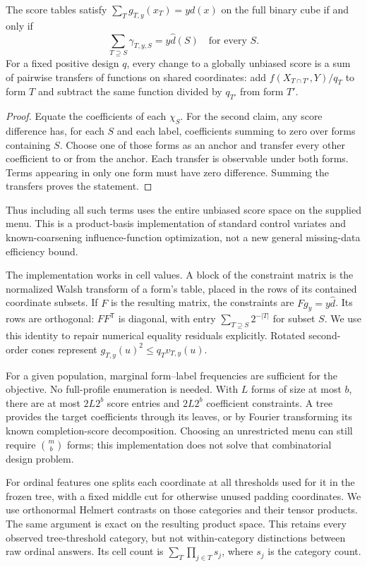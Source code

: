 \begin{proposition}\label{prop:sharing}
The score tables satisfy $\sum_Tg_{T,y}(x_T)=yd(x)$ on the full binary cube
if and only if
\[
       \sum_{T\supseteq S}\gamma_{T,y,S}=y\widehat d(S)
       \quad\text{for every }S.
\]
For a fixed positive design $q$, every change to a globally unbiased score
is a sum of pairwise transfers of functions on shared coordinates:
add $f(X_{T\cap T'},Y)/q_T$ to form $T$ and subtract the same function
divided by $q_{T'}$ from form $T'$.
\end{proposition}
\begin{proof}
Equate the coefficients of each $\chi_S$. For the second claim, any score
difference has, for each $S$ and each label, coefficients summing to zero
over forms containing $S$. Choose one of those forms as an anchor and
transfer every other coefficient to or from the anchor. Each transfer is
observable under both forms. Terms appearing in only one form must have
zero difference. Summing the transfers proves the statement.
\end{proof}
Thus including all such terms uses the entire unbiased score space on the
supplied menu. This is a product-basis implementation of standard control
variates and known-coarsening influence-function optimization, not a new
general missing-data efficiency bound.

The implementation works in cell values. A block of the constraint matrix
is the normalized Walsh transform of a form's table, placed in the rows of
its contained coordinate subsets. If $F$ is the resulting matrix, the
constraints are $Fg_y=y\widehat d$. Its rows are orthogonal:
$FF^{\mathsf T}$ is diagonal, with entry
$\sum_{T\supseteq S}2^{-|T|}$ for subset $S$. We use this identity to
repair numerical equality residuals explicitly. Rotated second-order cones
represent $g_{T,y}(u)^2\le q_Tv_{T,y}(u)$.

For a given population, marginal form--label frequencies are sufficient for
the objective. No full-profile enumeration is needed. With $L$ forms of
size at most $b$, there are at most $2L2^b$ score entries and $2L2^b$
coefficient constraints. A tree provides the target coefficients through
its leaves, or by Fourier transforming its known completion-score
decomposition. Choosing an unrestricted menu can still require
$\binom mb$ forms; this implementation does not solve that combinatorial
design problem.

For ordinal features one splits each coordinate at all thresholds used for it
in the frozen tree, with a fixed middle cut for otherwise unused padding
coordinates. We use orthonormal Helmert contrasts on those categories and
their tensor products. The same argument is exact on the resulting product
space. This retains every observed tree-threshold category, but not
within-category distinctions between raw ordinal answers. Its cell count
is $\sum_T\prod_{j\in T}s_j$, where $s_j$ is the category count.


